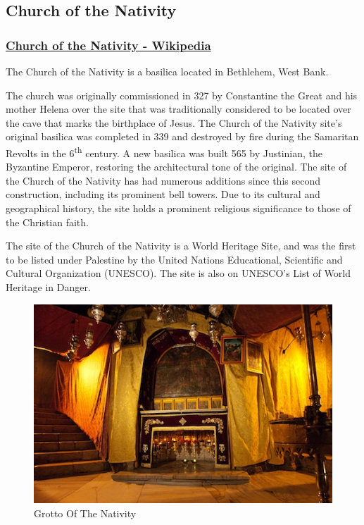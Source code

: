 \documentclass[letterpaper]{report}
\begin{document}
\clearpage
\subsection{Church of the Nativity}
\begin{multicols}{2}

\subsubsection{\href{https://en.wikipedia.org/wiki/Church_of_the_Nativity}{
Church of the Nativity - Wikipedia}}

The Church of the Nativity is a basilica located in Bethlehem, West Bank.

The church was originally commissioned in 327 by Constantine the Great and his 
mother Helena over the site that was traditionally considered to be located 
over the cave that marks the birthplace of Jesus.
The Church of the Nativity site's original basilica was completed in 339 and 
destroyed by fire during the Samaritan Revolts in the 6\textsuperscript{th} 
century.
A new basilica was built 565 by Justinian, the Byzantine Emperor,
restoring the architectural tone of the original.
The site of the Church of the Nativity has had numerous additions since this 
second construction, including its prominent bell towers.
Due to its cultural and geographical history,
the site holds a prominent religious significance to those of the Christian 
faith.

The site of the Church of the Nativity is a World Heritage Site,
and was the first to be listed under Palestine by the United Nations 
Educational,
Scientific and Cultural Organization (UNESCO).
The site is also on UNESCO's List of World Heritage in Danger.

\begin{figure}[H]
\centering
\label{fig:GrottoOfTheNativity}
\caption{Grotto Of The Nativity}
\includegraphics[width=\columnwidth]{GrottoOfTheNativity}
\end{figure}


\end{multicols}
\end{document}
